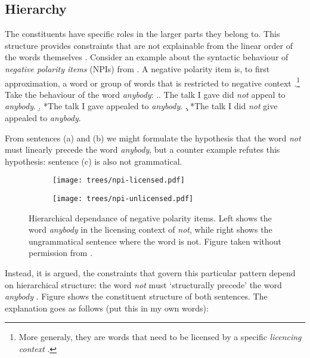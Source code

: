 \subsection{Hierarchy}
The constituents have specific roles in the larger parts they belong to. This structure provides constraints that are not explainable from the linear order of the words themselves \citep{everaert2015structures}. Consider an example about the syntactic behaviour of \textit{negative polarity items} (NPIs) from \citet{everaert2015structures}. A negative polarity item is, to first approximation, a word or group of words that is restricted to negative context \citep{everaert2015structures}.\footnote{More generaly, they are words that need to be licensed by a specific \textit{licencing context} \citep{giannakidou2011npi}.} Take the behaviour of the word \textit{anybody}:
\exi.\a. The talk I gave did \textit{not} appeal to \textit{anybody}.
     \b. *The talk I gave appealed to \textit{anybody}.
     \c. *The talk I did \textit{not} give appealed to \textit{anybody}.

From sentences (a) and (b) we might formulate the hypothesis that the word \textit{not} must linearly precede the word \textit{anybody}, but a counter example refutes this hypothesis: sentence (c) is also not grammatical.
\begin{figure}[h]
  \begin{subfigure}[b]{0.5\textwidth}
		\texttt{[image: trees/npi-licensed.pdf]}
	\end{subfigure}
	\begin{subfigure}[b]{0.5\textwidth}
		\texttt{[image: trees/npi-unlicensed.pdf]}
	\end{subfigure}
\caption{Hierarchical dependance of negative polarity items. Left shows the word \textit{anybody} in the licensing context of \textit{not}, while right shows the ungrammatical sentence where the word is not. Figure taken without permission from \cite{everaert2015structures}.}
\label{fig:trees-npi}
\end{figure}
Instead, it is argued, the constraints that govern this particular pattern depend on hierarchical structure: the word \textit{not} must `structurally precede' the word \textit{anybody} \citep{everaert2015structures}. Figure \label{ref:trees-npi} shows the constituent structure of both sentences. The explanation goes as follows (put this in my own words): 


